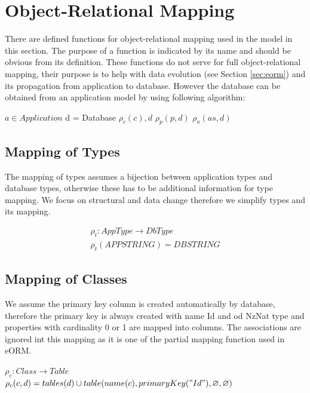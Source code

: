 \documentclass[11pt]{article}
\begin{document}
\section{Object-Relational Mapping}
\label{sec:orm}
There are defined functions for object-relational mapping used in the model in this section. The purpose of a function is indicated by its name and should be obvious from its definition. These functions do not serve for full object-relational mapping, their purpose is to help with data evolution (see Section \ref{sec:eorm}) and its propagation from application to database. However the database can be obtained from an application model by using following algorithm:

\begin{algorithmic}[1]
	\Require $a \in Application$
	\State d = Database
		\State $\rho_c(c), d$
			\State $\rho_p(p, d)$
		\EndFor
	 \EndFor
			\State $\rho_{a}(as, d)$
		\EndFor
	\EndFor
\end{algorithmic}


\subsection{Mapping of Types}
The mapping of types assumes a bijection between application types and database types, otherwise these has to be additional information for type mapping. We focus on structural and data change therefore we simplify types and its mapping.

\begin{equation*}
\begin{gathered}
	\rho_{t} : AppType \rightarrow DbType  \\
 	\rho_{t}(APPSTRING) = DBSTRING 
\end{gathered}
\end{equation*}

\subsection{Mapping of Classes}
We assume the primary key column is created automatically by database, therefore the primary key is always created with name Id and od NzNat type and properties with cardinality 0 or 1 are mapped into columns. The associations are ignored int this mapping as it is one of the partial mapping function used in eORM.

\begin{center}
$\rho_{c}: Class \rightarrow Table $ \\ 
$\rho_{c}(c,d) = tables(d) \cup table(name(c), primaryKey("Id"), \varnothing, \varnothing) $
\end{center}
\end{document}
